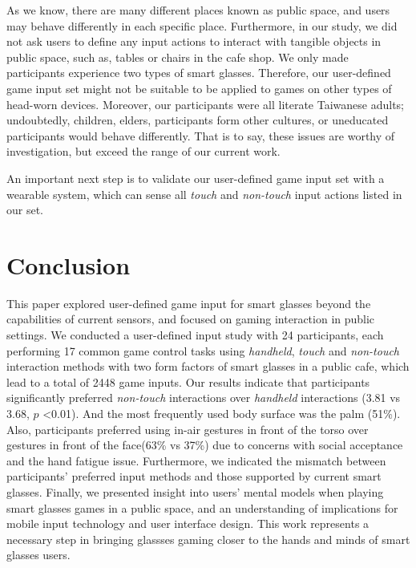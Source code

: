 \documentclass{sigchi}
\begin{document}
  As we know, there are many different places known as public space, and users may behave differently in each specific place. Furthermore, in our study, we did not ask users to define any input actions to interact with tangible objects in public space, such as, tables or chairs in the cafe shop. We only made participants experience two types of smart glasses. Therefore, our user-defined game input set might not be suitable to be applied to games on other types of head-worn devices. Moreover, our participants were all literate Taiwanese adults; undoubtedly, children, elders, participants form other cultures, or uneducated participants would behave differently. That is to say, these issues are worthy of investigation, but exceed the range of our current work.

  An important next step is to validate our user-defined game input set with a wearable system, which can sense all \emph{touch} and \emph{non-touch} input actions listed in our set.   


\section{Conclusion}

This paper explored user-defined game input for smart glasses beyond the capabilities of current sensors, and focused on gaming interaction in public settings. We conducted a user-defined input study with 24 participants, each performing 17 common game control tasks using \emph{handheld}, \emph{touch} and \emph{non-touch} interaction methods with two form factors of smart glasses in a public cafe, which lead to a total of 2448 game inputs. Our results indicate that participants significantly preferred \emph{non-touch} interactions over \emph{handheld} interactions (3.81 vs 3.68, $p$ \textless 0.01). And the most frequently used body surface was the palm (51\%). Also, participants preferred using in-air gestures in front of the torso over gestures in front of the face(63\% vs 37\%) due to concerns with social acceptance and the hand fatigue issue. Furthermore, we indicated the mismatch between participants' preferred input methods and those supported by current smart glasses. Finally, we presented insight into users' mental models when playing smart glasses games in a public space, and an understanding of implications for mobile input technology and user interface design. This work represents a necessary step in bringing glassses gaming closer to the hands and minds of smart glasses users.
\end{document}
